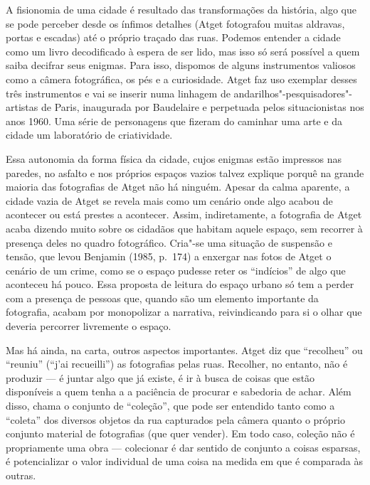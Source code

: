 A fisionomia de uma cidade é resultado das transformações da história,
algo que se pode perceber desde os ínfimos detalhes (Atget fotografou
muitas aldravas, portas e escadas) até o próprio traçado das ruas.
Podemos entender a cidade como um livro decodificado à espera de ser
lido, mas isso só será possível a quem saiba decifrar seus enigmas. Para
isso, dispomos de alguns instrumentos valiosos como a câmera
fotográfica, os pés e a curiosidade. Atget faz uso exemplar desses três
instrumentos e vai se inserir numa linhagem de
andarilhos"-pesquisadores"-artistas de Paris, inaugurada por Baudelaire e
perpetuada pelos situacionistas nos anos 1960. Uma série de personagens
que fizeram do caminhar uma arte e da cidade um laboratório de
criatividade.

Essa autonomia da forma física da cidade, cujos enigmas estão impressos
nas paredes, no asfalto e nos próprios espaços vazios talvez explique
porquê na grande maioria das fotografias de Atget não há ninguém. Apesar
da calma aparente, a cidade vazia de Atget se revela mais como um
cenário onde algo acabou de acontecer ou está prestes a acontecer.
Assim, indiretamente, a fotografia de Atget acaba dizendo muito sobre os
cidadãos que habitam aquele espaço, sem recorrer à presença deles no
quadro fotográfico. Cria"-se uma situação de suspensão e tensão, que
levou Benjamin (1985, p.~174) a enxergar nas fotos de Atget o cenário de
um crime, como se o espaço pudesse reter os ``indícios'' de algo que
aconteceu há pouco. Essa proposta de leitura do espaço urbano só tem a
perder com a presença de pessoas que, quando são um elemento importante
da fotografia, acabam por monopolizar a narrativa, reivindicando para si
o olhar que deveria percorrer livremente o espaço.

Mas há ainda, na carta, outros aspectos importantes. Atget diz que
``recolheu'' ou ``reuniu'' (``j'ai recueilli'') as fotografias pelas
ruas. Recolher, no entanto, não é produzir --- é juntar algo que já
existe, é ir à busca de coisas que estão disponíveis a quem tenha a a
paciência de procurar e sabedoria de achar. Além disso, chama o conjunto
de ``coleção'', que pode ser entendido tanto como a ``coleta'' dos
diversos objetos da rua capturados pela câmera quanto o próprio conjunto
material de fotografias (que quer vender). Em todo caso, coleção não é
propriamente uma obra --- colecionar é dar sentido de conjunto a coisas
esparsas, é potencializar o valor individual de uma coisa na medida em
que é comparada às outras.

